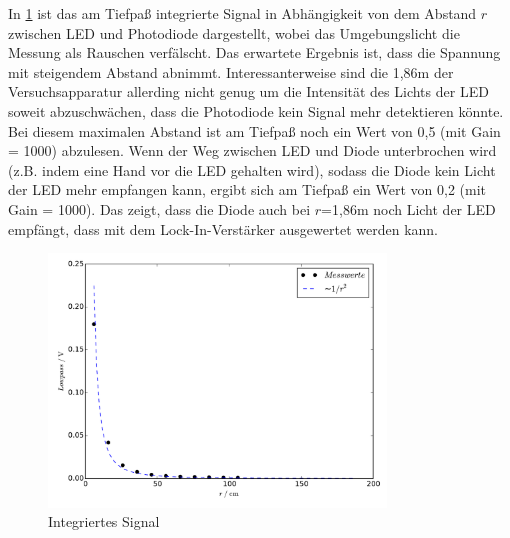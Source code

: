 In \ref{fig:plot4} ist das am Tiefpaß integrierte Signal in Abhängigkeit von
dem Abstand $r$ zwischen LED und Photodiode dargestellt, wobei das Umgebungslicht
die Messung als Rauschen verfälscht. Das erwartete Ergebnis
ist, dass die Spannung mit steigendem Abstand abnimmt. Interessanterweise
sind die 1,86m der Versuchsapparatur allerding nicht genug um die Intensität
des Lichts der LED soweit abzuschwächen, dass die Photodiode kein Signal
mehr detektieren könnte. Bei diesem maximalen Abstand ist am Tiefpaß noch ein
Wert von 0,5 (mit Gain = 1000) abzulesen. Wenn der Weg zwischen LED und
Diode unterbrochen wird (z.B. indem eine Hand vor die LED gehalten wird),
sodass die Diode kein Licht der LED mehr empfangen kann, ergibt sich am
Tiefpaß ein Wert von 0,2 (mit Gain = 1000). Das zeigt, dass die Diode auch
bei $r$=1,86m noch Licht der LED empfängt, dass mit dem Lock-In-Verstärker
ausgewertet werden kann.
\begin{figure}
  \centering
  \includegraphics[width=0.8\textwidth, height=0.5\textwidth]{plot4.pdf}
  \caption{Integriertes Signal}
  \label{fig:plot4}
\end{figure}
